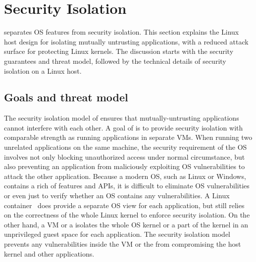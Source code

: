 \section{Security Isolation}
\label{sec:linux:security}

\graphene{} separates OS features from security isolation.
This section explains the Linux host design for isolating mutually untrusting applications, with a reduced attack surface for protecting Linux kernels.
The discussion starts with the security guarantees and threat model, followed by the technical details of security isolation on a Linux host.



\subsection{Goals and threat model}

The security isolation model of \graphene{} ensures that mutually-untrusting applications cannot interfere with each other.
A goal of \graphene{} is to provide security isolation with comparable strength as
running applications in separate VMs.
When running two unrelated applications on the same machine,
the security requirement
of the OS involves not only blocking unauthorized access under normal circumstance,
but also preventing an application
from maliciously exploiting OS vulnerabilities to attack the other application.
Because a modern OS, such as Linux or Windows, contains a rich of features and APIs,
it is difficult to eliminate OS vulnerabilities
or even just to verify whether an OS contains any vulnerabilities. 
A Linux container~\cite{lxc}
does provide a separate OS view for each application,
but still relies on the correctness of the whole Linux kernel to enforce security isolation.
On the other hand, a VM or a \libos{}
isolates the whole OS kernel or a part of the kernel in an unprivileged guest space
for each application.
The security isolation model prevents
any vulnerabilities inside the VM or the \libos{} from compromising the host kernel and other applications.



